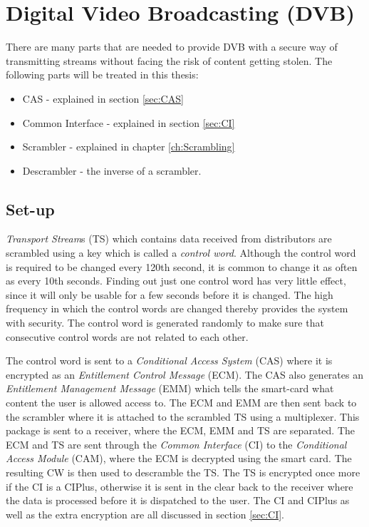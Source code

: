 \chapter{Digital Video Broadcasting (DVB)}
There are many parts that are needed to provide DVB with a secure way 
of transmitting streams without facing the risk of content getting 
stolen. The following parts will be treated in this thesis:

\begin{itemize}
\item CAS - explained in section \ref{sec:CAS}
\item Common Interface - explained in section \ref{sec:CI}
\item Scrambler - explained in chapter \ref{ch:Scrambling}
\item Descrambler - the inverse of a scrambler.
\end{itemize}

\section{Set-up} \label{sec:setup}
\emph{Transport Stream}s (TS) which contains data received from 
distributors are scrambled using a key which is called a 
\emph{control word}. Although the control word is required to be changed
every 120th second, it is common to change it as often as every 
10th seconds. Finding out just one control word has very little effect, 
since it will only be usable for a few seconds before it is changed. 
The high frequency in which the control words are changed thereby 
provides the system with security. The control word is generated 
randomly to make sure that consecutive control words are not related 
to each other.

The control word is sent to a \emph{Conditional Access System} (CAS) 
where it is encrypted as an \emph{Entitlement Control Message} (ECM). 
The CAS also generates an \emph{Entitlement Management Message} (EMM) 
which tells the smart-card what content the user is allowed access to. 
The ECM and EMM are then sent back to the scrambler where it is 
attached to the scrambled TS using a multiplexer. This package is sent 
to a receiver, where the ECM, EMM and TS are separated. The ECM and TS 
are sent through the \emph{Common Interface} (CI) to the 
\emph{Conditional Access Module} (CAM), where the ECM is decrypted 
using the smart card. The resulting CW is then used to descramble the 
TS. The TS is encrypted once more if the CI is a CIPlus, otherwise it 
is sent in the clear back to the receiver where the data is processed 
before it is dispatched to the user. The CI and CIPlus as well as the 
extra encryption are all discussed in section \ref{sec:CI}.

